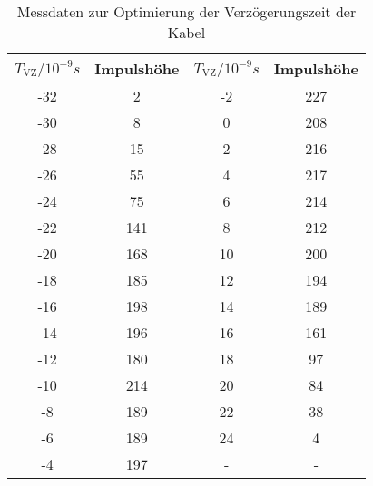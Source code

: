 \begin{table}[h!]
  \centering
  \caption{Messdaten zur Optimierung der Verzögerungszeit der Kabel}
  \label{tab:verzögerung}
  \begin{tabular}{c c c c}
    \toprule
      $T_{\text{VZ}}/10^{-9}s$ & Impulshöhe & $T_{\text{VZ}}/10^{-9}s$ & Impulshöhe \\
      \midrule
      -32   &   2    &    -2    &   227  \\
      -30   &   8    &    0     &   208  \\
      -28   &   15   &    2     &   216  \\
      -26   &   55   &    4     &   217  \\
      -24   &   75   &    6     &   214  \\
      -22   &   141  &    8     &   212  \\
      -20   &   168  &    10    &   200  \\
      -18   &   185  &    12    &   194  \\
      -16   &   198  &    14    &   189  \\
      -14   &   196  &    16    &   161  \\
      -12   &   180  &    18    &   97   \\
      -10   &   214  &    20    &   84   \\
      -8    &   189  &    22    &   38   \\
      -6    &   189  &    24    &   4    \\
      -4    &   197  &     -    &    -   \\
    \bottomrule
  \end{tabular}
\end{table}

%

